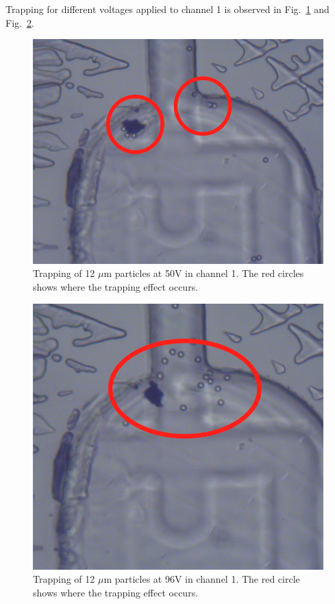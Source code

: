 \documentclass[journal, a4paper]{IEEEtran}
\begin{document}
Trapping for different voltages applied to channel 1 is observed in Fig.~\ref{fig:1-50V} and Fig.~\ref{fig:1-96V}.

\begin{figure}[!hbt]
	\begin{center}
		\includegraphics[width=\columnwidth]{images/1-50V.png}
		\caption{\label{fig:1-50V} Trapping of 12 $\mu$m particles at 50V in channel 1. The red circles shows where the trapping effect occurs.}
	\end{center}
\end{figure}

\begin{figure}[!hbt]
	\begin{center}
		\includegraphics[width=\columnwidth]{images/1-96V.png}
		\caption{\label{fig:1-96V} Trapping of 12 $\mu$m particles at 96V in channel 1. The red circle shows where the trapping effect occurs.}
	\end{center}
\end{figure}
\end{document}
